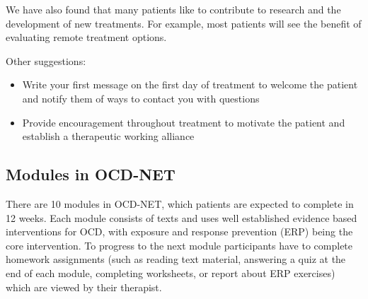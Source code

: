 \documentclass[]{book}
\providecommand{\tightlist}{%
  \setlength{\itemsep}{0pt}\setlength{\parskip}{0pt}}
\theoremstyle{definition}
\theoremstyle{definition}
\theoremstyle{definition}
\theoremstyle{remark}
\begin{document}
We have also found that many patients like to contribute to research and
the development of new treatments. For example, most patients will see
the benefit of evaluating remote treatment options.

Other suggestions:

\begin{itemize}
\tightlist
\item
  Write your first message on the first day of treatment to welcome the
  patient and notify them of ways to contact you with questions
\item
  Provide encouragement throughout treatment to motivate the patient and
  establish a therapeutic working alliance
\end{itemize}

\hypertarget{modules-in-ocd-net}{%
\subsection{Modules in OCD-NET}\label{modules-in-ocd-net}}

There are 10 modules in OCD-NET, which patients are expected to complete
in 12 weeks. Each module consists of texts and uses well established
evidence based interventions for OCD, with exposure and response
prevention (ERP) being the core intervention. To progress to the next
module participants have to complete homework assignments (such as
reading text material, answering a quiz at the end of each module,
completing worksheets, or report about ERP exercises) which are viewed
by their therapist.
\end{document}
